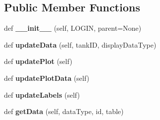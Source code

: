 \subsection*{Public Member Functions}
\begin{DoxyCompactItemize}
\item 
\mbox{\label{classferment_monitor_1_1_ferment_plot_a153c4a428ac6b8be4ff2e94bbd247dae}} 
def {\bfseries \+\_\+\+\_\+init\+\_\+\+\_\+} (self, L\+O\+G\+IN, parent=None)
\item 
\mbox{\label{classferment_monitor_1_1_ferment_plot_a4711fa16b8baa00ee044582f5755f981}} 
def {\bfseries update\+Data} (self, tank\+ID, display\+Data\+Type)
\item 
\mbox{\label{classferment_monitor_1_1_ferment_plot_a782ec290f0f778372ea038aaefdccd18}} 
def {\bfseries update\+Plot} (self)
\item 
\mbox{\label{classferment_monitor_1_1_ferment_plot_adc97325bbd485dfaffc97cd21b62d189}} 
def {\bfseries update\+Plot\+Data} (self)
\item 
\mbox{\label{classferment_monitor_1_1_ferment_plot_a0704315fe82379534a4ce0483d8f43df}} 
def {\bfseries update\+Labels} (self)
\item 
\mbox{\label{classferment_monitor_1_1_ferment_plot_a3024d71dfd006bd9280fe9c5e86466c0}} 
def {\bfseries get\+Data} (self, data\+Type, id, table)
\end{DoxyCompactItemize}
